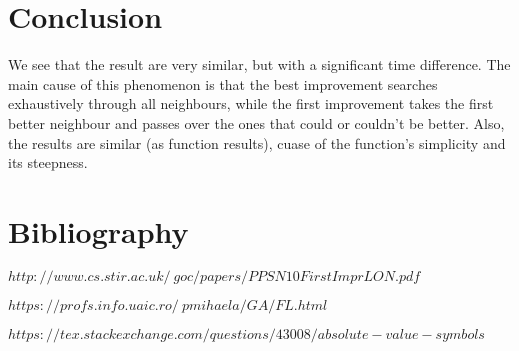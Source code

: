 \documentclass{article}
\begin{document}


\section{Conclusion}

We see that the result are very similar, but with a significant time difference. The main cause of this phenomenon is that the best improvement searches exhaustively through all neighbours, while the first improvement takes the first better neighbour and passes over the ones that could or couldn't be better. 
Also, the results are similar (as function results), cuase of the function's simplicity and its steepness.







\section{Bibliography}

$http://www.cs.stir.ac.uk/~goc/papers/PPSN10FirstImprLON.pdf$

$https://profs.info.uaic.ro/~pmihaela/GA/FL.html$

$https://tex.stackexchange.com/questions/43008/absolute-value-symbols$
\end{document}

